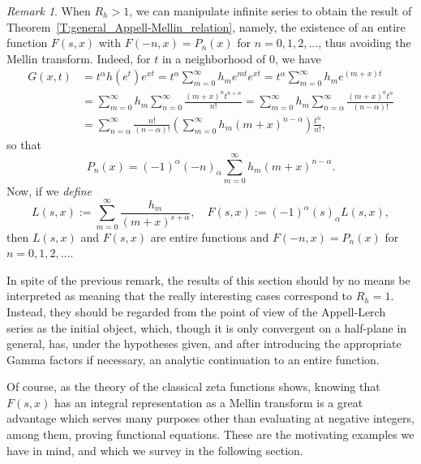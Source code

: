\documentclass[11pt,a4paper]{amsart}
\newcommand{\pochhammer}[2]{(#1)_{#2}}
\theoremstyle{plain}
\theoremstyle{plain}
\theoremstyle{definition}
\theoremstyle{remark}
\newtheorem*{remark}{Remark}
\begin{document}
\begin{remark}
When $R_{h} > 1$, we can manipulate infinite series to obtain the result of Theorem~\ref{T:general_Appell-Mellin_relation}, namely, the existence of an entire function $F(s,x)$ with $F(-n,x) = P_{n}(x)$ for $n=0,1,2,\dots$, thus avoiding the Mellin transform. Indeed, for $t$ in a neighborhood of $0$, we have
\begin{align*}
	G(x,t) &= t^{\alpha} h(e^{t}) e^{xt}
	        = t^{\alpha} \sum_{m=0}^{\infty} h_{m} e^{mt} e^{xt}
		    = t^{\alpha} \sum_{m=0}^{\infty} h_{m} e^{(m + x)t}
		   \\
		   &= \sum_{m=0}^{\infty} h_{m} \sum_{n=0}^{\infty} \frac{(m+x)^{n} t^{n+\alpha}}{n!}
		    = \sum_{m=0}^{\infty} h_{m} \sum_{n=\alpha}^{\infty} \frac{(m+x)^{n} t^{n}}{(n-\alpha)!}
		   \\
		   &= \sum_{n=\alpha}^{\infty} \frac{n!}{(n-\alpha)!}
			  \left(\sum_{m=0}^{\infty} h_{m} (m+x)^{n-\alpha} \right)       
			  \frac{t^{n}}{n!},
\end{align*}
so that
\[
	P_{n}(x) = (-1)^{\alpha} \pochhammer{-n}{\alpha} \sum_{m=0}^{\infty} h_{m} (m+x)^{n-\alpha}.
\]
Now, if we \emph{define}
\[
	L(s,x) := \sum_{m=0}^{\infty} \frac{h_{m}}{(m+x)^{s+\alpha}},
	\quad
	F(s,x) := (-1)^{\alpha} \pochhammer{s}{\alpha} L(s,x),
\]
then $L(s,x)$ and $F(s,x)$ are entire functions and $F(-n,x) = P_{n}(x)$ for $n=0,1,2,\dots$.
\end{remark}

In spite of the previous remark, the results of this section should by no means  be interpreted as meaning that the really interesting cases correspond to $R_{h} = 1$. Instead, they should be regarded from the point of view of the Appell-Lerch series as the initial object, which, though it is only convergent on a half-plane in general, has, under the hypotheses given, and after introducing the appropriate Gamma factors if necessary, an analytic continuation to an entire function.

Of course, as the theory of the classical zeta functions shows, knowing that $F(s,x)$ has an integral representation as a Mellin transform is a great advantage which serves many purposes other than evaluating at negative integers, among them, proving functional equations. These are the motivating examples we have in mind, and which we survey in the following section.
\end{document}
